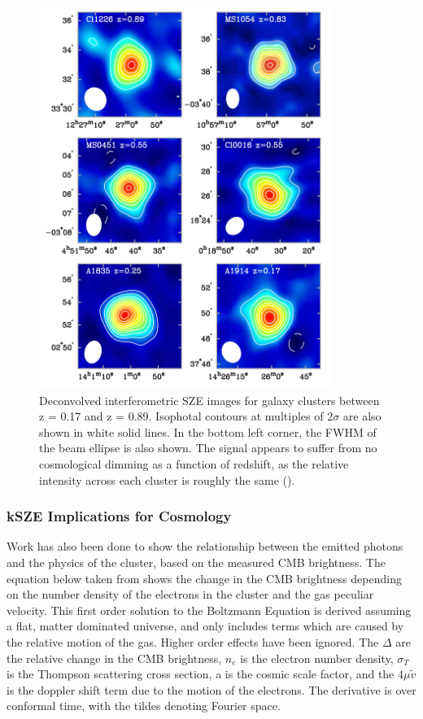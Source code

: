 \documentclass[manuscript]{aastex}
\begin{document}
\newpage
\begin{figure}[H]
\centering
\captionsetup{width=0.85\textwidth}
\includegraphics[width=0.85\textwidth]{carlstrom1.png}
\caption[An example of the redshift independence of SZE measurements for six different clusters. -(\cite{Carlstrom2002})]{Deconvolved interferometric SZE images for galaxy clusters between z = 0.17 and z = 0.89. Isophotal contours at multiples of \(2\sigma\) are also shown in white solid lines. In the bottom left corner, the FWHM of the beam ellipse is also shown. The signal appears to suffer from no cosmological dimming as a function of redshift, as the relative intensity across each cluster is roughly the same (\cite{Carlstrom2002}).}
\end{figure}

\subsubsection{kSZE Implications for Cosmology}

Work has also been done to show the relationship between the emitted photons and the physics of the cluster, based on the measured CMB brightness. The equation below taken from \cite{Dodelson1995} shows the change in the CMB brightness depending on the number density of the electrons in the cluster and the gas peculiar velocity. This first order solution to the Boltzmann Equation is derived assuming a flat, matter dominated universe, and only includes terms which are caused by the relative motion of the gas. Higher order effects have been ignored. The $\Delta$ are the relative change in the CMB brightness, $n_{e}$ is the electron number density, $\sigma_{T}$ is the Thompson scattering cross section, a is the cosmic scale factor, and the $4 \mu \tilde v$ is the doppler shift term due to the motion of the electrons. The derivative is over conformal time, with the tildes denoting Fourier space. 
\end{document}
